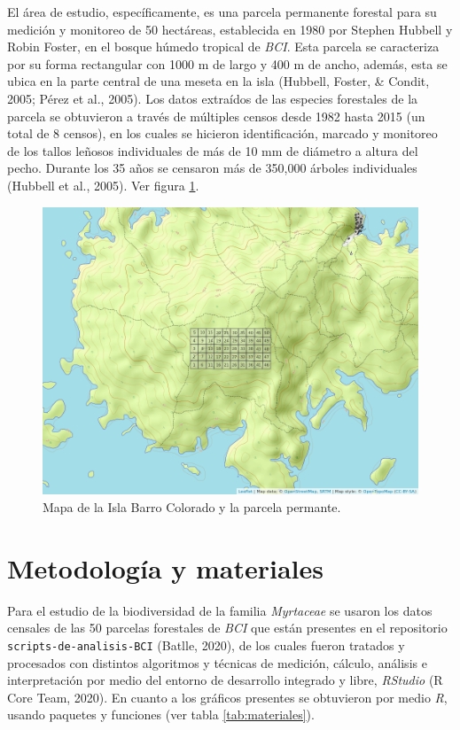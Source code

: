 \documentclass[11pt,]{article}
\begin{document}
El área de estudio, específicamente, es una parcela permanente forestal
para su medición y monitoreo de 50 hectáreas, establecida en 1980 por
Stephen Hubbell y Robin Foster, en el bosque húmedo tropical de
\emph{BCI}. Esta parcela se caracteriza por su forma rectangular con
1000 m de largo y 400 m de ancho, además, esta se ubica en la parte
central de una meseta en la isla (Hubbell, Foster, \& Condit, 2005;
Pérez et al., 2005). Los datos extraídos de las especies forestales de
la parcela se obtuvieron a través de múltiples censos desde 1982 hasta
2015 (un total de 8 censos), en los cuales se hicieron identificación,
marcado y monitoreo de los tallos leñosos individuales de más de 10 mm
de diámetro a altura del pecho. Durante los 35 años se censaron más de
350,000 árboles individuales (Hubbell et al., 2005). Ver figura
\ref{fig:bci_map}.

\begin{figure}
\centering
\includegraphics[width=1.00000\textwidth]{mapa_cuadros2.png}
\caption{Mapa de la Isla Barro Colorado y la parcela
permante.\label{fig:bci_map}}
\end{figure}

\section{Metodología y materiales}\label{metodologuxeda-y-materiales}

Para el estudio de la biodiversidad de la familia \emph{Myrtaceae} se
usaron los datos censales de las 50 parcelas forestales de \emph{BCI}
que están presentes en el repositorio \texttt{scripts-de-analisis-BCI}
(Batlle, 2020), de los cuales fueron tratados y procesados con distintos
algoritmos y técnicas de medición, cálculo, análisis e interpretación
por medio del entorno de desarrollo integrado y libre, \emph{RStudio} (R
Core Team, 2020). En cuanto a los gráficos presentes se obtuvieron por
medio \emph{R}, usando paquetes y funciones (ver tabla
\ref{tab:materiales}).
\end{document}
